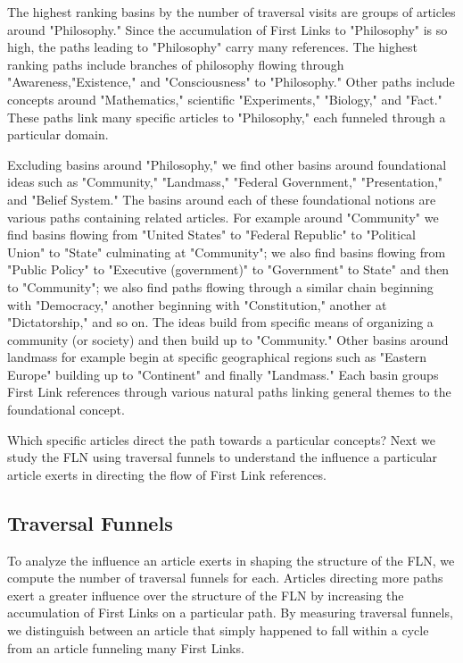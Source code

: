 \documentclass[pre,twocolumn,twoside,superscriptaddress,floatfix, aps, 10pt]{revtex4-1}
\begin{document}
The highest ranking basins by the number of traversal visits are groups of articles
around "Philosophy." 
Since the accumulation of First Links to "Philosophy" is so high, 
the paths leading to "Philosophy" carry many references.
The highest ranking paths include branches of philosophy flowing through 
"Awareness,"Existence," and "Consciousness" to "Philosophy." Other paths
include concepts around "Mathematics," scientific "Experiments," 
"Biology," and "Fact."
These paths link many specific articles to "Philosophy," each funneled through a particular domain.

Excluding basins around "Philosophy," we find other basins around 
foundational ideas such as "Community," "Landmass," "Federal Government," 
"Presentation," and "Belief System." 
The basins around each of these foundational notions are 
various paths containing related articles. For example around 
"Community" we find basins
flowing from "United States" to "Federal Republic" to "Political Union" to "State" culminating at "Community"; we also find basins flowing from 
"Public Policy" to "Executive (government)" to "Government" to State" and then 
to "Community"; we also find paths flowing through a similar chain beginning
with "Democracy," another beginning with "Constitution," another at 
"Dictatorship," and so on. The ideas build from specific means of organizing
a community (or society) and then build up to "Community." 
Other basins around landmass for example begin at specific geographical regions
such as "Eastern Europe" building up to "Continent" and finally "Landmass."
Each basin groups First Link references through various 
natural paths linking general themes to the foundational concept.

Which specific articles direct the path towards a particular concepts? 
Next we study the FLN using traversal funnels to understand the influence
a particular article exerts in directing the flow of First Link references.



\subsection{Traversal Funnels}

To analyze the influence an article exerts in shaping the 
structure of the FLN, we compute the number of traversal funnels for each.
Articles directing more paths exert a greater influence over the structure
of the FLN by increasing the accumulation of First Links
on a particular path. By measuring traversal funnels, we distinguish between an article that simply happened to fall within a cycle from an article funneling 
many First Links.
\end{document}
